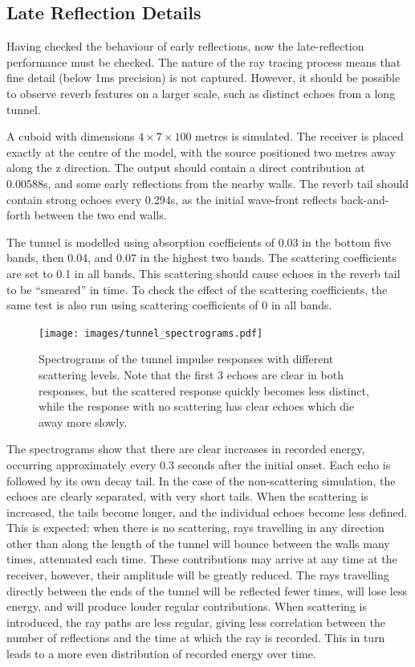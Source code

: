 \documentclass[]{scrreprt}
\begin{document}
\subsection{Late Reflection Details}\label{late-reflection-details}

Having checked the behaviour of early reflections, now the
late-reflection performance must be checked. The nature of the ray
tracing process means that fine detail (below 1ms precision) is not
captured. However, it should be possible to observe reverb features on a
larger scale, such as distinct echoes from a long tunnel.

A cuboid with dimensions \(4 \times 7 \times 100\) metres is simulated.
The receiver is placed exactly at the centre of the model, with the
source positioned two metres away along the z direction. The output
should contain a direct contribution at 0.00588s, and some early
reflections from the nearby walls. The reverb tail should contain strong
echoes every 0.294s, as the initial wave-front reflects back-and-forth
between the two end walls.

The tunnel is modelled using absorption coefficients of 0.03 in the
bottom five bands, then 0.04, and 0.07 in the highest two bands. The
scattering coefficients are set to 0.1 in all bands. This scattering
should cause echoes in the reverb tail to be ``smeared'' in time. To
check the effect of the scattering coefficients, the same test is also
run using scattering coefficients of 0 in all bands.

\begin{figure}[htbp]
\centering
\texttt{[image: images/tunnel\_spectrograms.pdf]}
\caption{Spectrograms of the tunnel impulse responses with different
scattering levels. Note that the first 3 echoes are clear in both
responses, but the scattered response quickly becomes less distinct,
while the response with no scattering has clear echoes which die away
more slowly.\label{fig:tunnel_spectrograms}}
\end{figure}

The spectrograms show that there are clear increases in recorded energy,
occurring approximately every 0.3 seconds after the initial onset. Each
echo is followed by its own decay tail. In the case of the
non-scattering simulation, the echoes are clearly separated, with very
short tails. When the scattering is increased, the tails become longer,
and the individual echoes become less defined. This is expected: when
there is no scattering, rays travelling in any direction other than
along the length of the tunnel will bounce between the walls many times,
attenuated each time. These contributions may arrive at any time at the
receiver, however, their amplitude will be greatly reduced. The rays
travelling directly between the ends of the tunnel will be reflected
fewer times, will lose less energy, and will produce louder regular
contributions. When scattering is introduced, the ray paths are less
regular, giving less correlation between the number of reflections and
the time at which the ray is recorded. This in turn leads to a more even
distribution of recorded energy over time.
\end{document}
